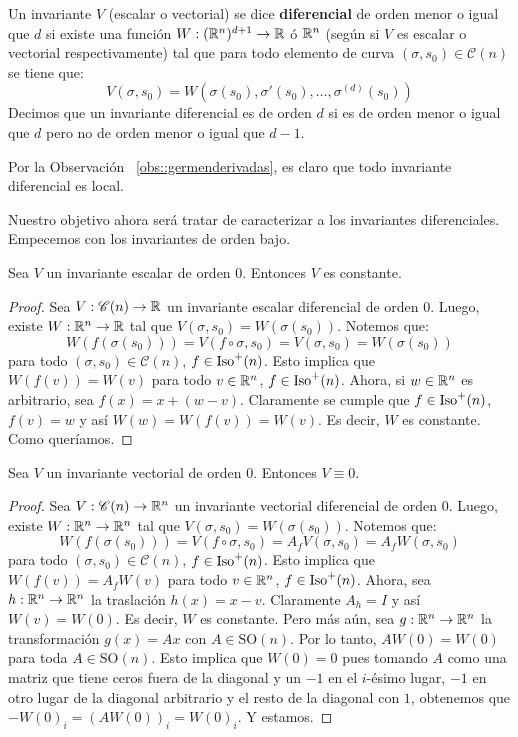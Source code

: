 \begin{defn}
Un invariante $V$ (escalar o vectorial) se dice \textbf{diferencial} de orden menor o igual que $d$ si existe una función $W:(\mathbb{R}^n)^{d+1}\to \mathbb{R}$ ó $\mathbb{R}^n$ (según si $V$ es escalar o vectorial respectivamente) tal que para todo elemento de curva $(\sigma,s_0)\in\mathscr{C}(n)$ se tiene que: $$V(\sigma,s_0)=W(\sigma(s_0),\sigma'(s_0),\ldots ,\sigma^{(d)}(s_0))$$ Decimos que un invariante diferencial es de orden $d$ si es de orden menor o igual que $d$ pero no de orden menor o igual que $d-1$.
\end{defn}

\begin{obs} Por la Observación ~\ref{obs::germenderivadas}, es claro que todo invariante diferencial es local.
\end{obs}

Nuestro objetivo ahora será tratar de caracterizar a los invariantes diferenciales. Empecemos con los invariantes de orden bajo. 

\begin{prop}
Sea $V$ un invariante escalar de orden $0$. Entonces $V$ es constante.
\begin{proof}
Sea $V:\mathscr{C}(n)\to \mathbb{R}$ un invariante escalar diferencial de orden $0$. Luego, existe $W:\mathbb{R}^n\to\mathbb{R}$ tal que $V(\sigma,s_0)=W(\sigma(s_0))$. Notemos que: $$W(f(\sigma(s_0))) = V(f\circ\sigma,s_0)=V(\sigma,s_0)=W(\sigma(s_0))$$ para todo $(\sigma,s_0)\in\mathscr{C}(n)$, $f\in\operatorname{Iso}^+(n)$. Esto implica que $W(f(v))=W(v)$ para todo $v\in\mathbb{R}^n$, $f\in\operatorname{Iso}^+(n)$. Ahora, si $w\in\mathbb{R}^n$ es arbitrario, sea $f(x)=x+(w-v)$. Claramente se cumple que $f\in\operatorname{Iso}^+(n)$, $f(v)=w$ y así $W(w)=W(f(v))=W(v)$. Es decir, $W$ es constante. Como queríamos.
\end{proof}
\end{prop}

\begin{prop}
Sea $V$ un invariante vectorial de orden $0$. Entonces $V\equiv 0$.
\begin{proof}
Sea $V:\mathscr{C}(n)\to\mathbb{R}^n$ un invariante vectorial diferencial de orden $0$. Luego, existe $W:\mathbb{R}^n\to\mathbb{R}^n$ tal que $V(\sigma,s_0)=W(\sigma(s_0))$. Notemos que: $$W(f(\sigma(s_0))) = V(f\circ\sigma,s_0)=A_f V(\sigma,s_0) = A_f W(\sigma,s_0)$$ para todo $(\sigma,s_0)\in\mathscr{C}(n)$, $f\in\operatorname{Iso}^+(n)$. Esto implica que $W(f(v))=A_f W(v)$ para todo $v\in\mathbb{R}^n$, $f\in\operatorname{Iso}^+(n)$. Ahora, sea $h:\mathbb{R}^n\to\mathbb{R}^n$ la traslación $h(x)=x-v$. Claramente $A_h=I$ y así $W(v)=W(0)$. Es decir, $W$ es constante. Pero más aún, sea $g:\mathbb{R}^n\to\mathbb{R}^n$ la transformación $g(x)=Ax$ con $A\in\mathrm{SO}(n)$. Por lo tanto, $AW(0)=W(0)$ para toda $A\in\mathrm{SO}(n)$. Esto implica que $W(0)=0$ pues tomando $A$ como una matriz que tiene ceros fuera de la diagonal y un $-1$ en el $i$-ésimo lugar, $-1$ en otro lugar de la diagonal arbitrario y el resto de la diagonal con $1$, obtenemos que $-W(0)_i = (AW(0))_i = W(0)_i$. Y estamos.
\end{proof}
\end{prop}

